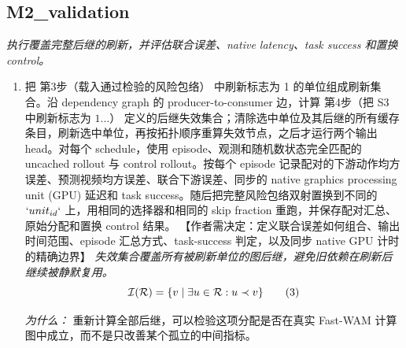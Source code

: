 \documentclass[10pt,a4paper]{article}
\begin{document}
\subsection*{M2\_validation}
\emph{执行覆盖完整后继的刷新，并评估联合误差、native latency、task success 和置换 control。}
\begin{enumerate}[leftmargin=*,start=4]
  \item 把 第3步（载入通过检验的风险包络） 中刷新标志为 1 的单位组成刷新集合。沿 dependency graph 的 producer-to-consumer 边，计算 第4步（把 S3 中刷新标志为 \(1\dots \)） 定义的后继失效集合；清除选中单位及其后继的所有缓存条目，刷新选中单位，再按拓扑顺序重算失效节点，之后才运行两个输出 head。对每个 schedule，使用 episode、观测和随机数状态完全匹配的 uncached rollout 与 control rollout。按每个 episode 记录配对的下游动作均方误差、预测视频均方误差、联合下游误差、同步的 native graphics processing unit (GPU) 延迟和 task success。随后把完整风险包络双射置换到不同的 \(`unit_{id}`\) 上，用相同的选择器和相同的 skip fraction 重跑，并保存配对汇总、原始分配和置换 control 结果。 【作者需决定：定义联合误差如何组合、输出时间范围、episode 汇总方式、task-success 判定，以及同步 native GPU 计时的精确边界】
\noindent\emph{失效集合覆盖所有被刷新单位的图后继，避免旧依赖在刷新后继续被静默复用。}
\begin{equation}
\resizebox{\ifdim\width>\linewidth \linewidth\else\width\fi}{!}{$\displaystyle \mathcal{I}(\mathcal{R})=\{v\mid \exists u\in\mathcal{R}:u\prec v\}$} \tag{3}
\end{equation}
\par\emph{为什么：} 重新计算全部后继，可以检验这项分配是否在真实 Fast-WAM 计算图中成立，而不是只改善某个孤立的中间指标。
\end{enumerate}
\end{document}
